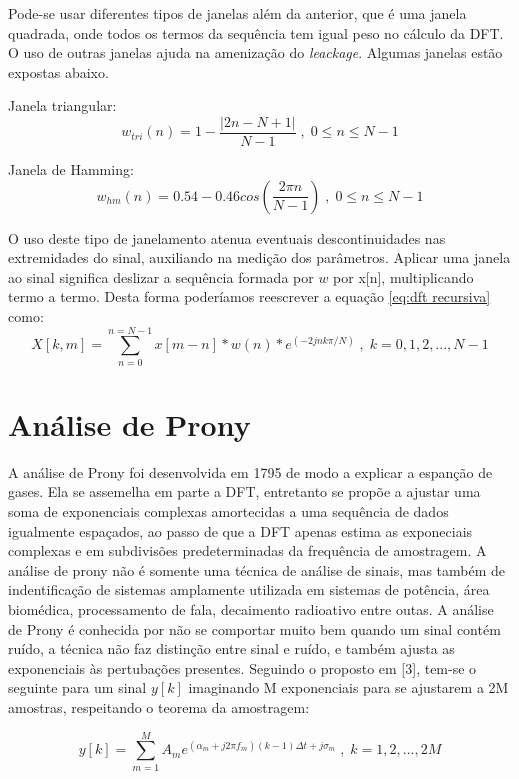 \indent Pode-se usar diferentes tipos de janelas além da anterior, que é uma janela quadrada, onde todos os termos da sequência tem igual peso no cálculo da DFT. O uso de outras janelas ajuda na amenização do \textit{leackage}. Algumas janelas estão expostas abaixo.

Janela triangular:
\begin{equation}
w_{tri}(n)=1-\frac{|2n-N+1|}{N-1}\;,\;0\leq n \leq N-1
\end{equation}

Janela de Hamming:
\begin{equation}
w_{hm}(n)=0.54-0.46cos(\frac{2\pi n}{N-1})\;,\;0\leq n \leq N-1
\end{equation}

\indent O uso deste tipo de janelamento atenua eventuais descontinuidades nas extremidades do sinal, auxiliando na medição dos parâmetros. Aplicar uma janela ao sinal significa deslizar a sequência formada por $w$ por x[n], multiplicando termo a termo. Desta forma poderíamos reescrever a equação \ref{eq:dft recursiva} como:
\begin{equation}
X[k,m]=\sum_{n=0}^{n=N-1} x[m-n]*w(n)*e^{(-2jnk\pi/N)}\;,\;k=0,1,2,...,N-1
\end{equation}

\section{Análise de Prony}
A análise de Prony foi desenvolvida em 1795 de modo a explicar a espanção de gases. Ela se assemelha em parte a DFT, entretanto se propõe a ajustar uma soma de exponenciais complexas amortecidas a uma sequência de dados igualmente espaçados, ao passo de que a DFT apenas estima as exponeciais complexas e em subdivisões predeterminadas da frequência de amostragem. A análise de prony não é somente uma técnica de análise de sinais, mas também de indentificação de sistemas amplamente utilizada em sistemas de potência, área biomédica, processamento de fala, decaimento radioativo entre outas. 
A análise de Prony é conhecida por não se comportar muito bem quando um sinal contém ruído, a técnica não faz distinção entre sinal e ruído, e também ajusta as exponenciais às pertubações presentes.
Seguindo o proposto em [3], tem-se o seguinte para um sinal $y[k]$ imaginando M exponenciais para se ajustarem a 2M amostras, respeitando o teorema da amostragem:


\begin{equation}
y[k]=\sum_{m=1}^{M}A_me^{(\alpha_m+j2\pi f_m)(k-1)\Delta t +j\sigma_m}\;,\;k=1,2,...,2M
\end{equation}



